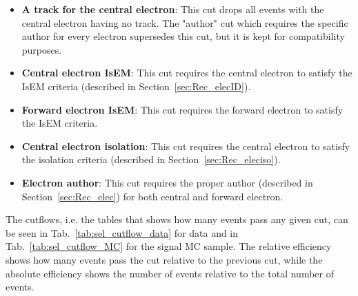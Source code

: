 \begin{itemize}
\item {\bfseries A track for the central electron}: This cut drops all events with the central electron having no track. The "author" cut which requires the specific author for every electron supersedes this cut, but it is kept for compatibility purposes.
\item {\bfseries Central electron IsEM}: This cut requires the central electron to satisfy the IsEM criteria (described in Section~\ref{sec:Rec_elecID}).
\item {\bfseries Forward electron IsEM}: This cut requires the forward electron to satisfy the IsEM criteria.
\item {\bfseries Central electron isolation}: This cut requires the central electron to satisfy the isolation criteria (described in Section~\ref{sec:Rec_eleciso}).
\item {\bfseries Electron author}: This cut requires the proper author (described in Section~\ref{sec:Rec_elec}) for both central and forward electron.
\end{itemize}

The cutflows, i.e. the tables that shows how many events pass any given cut, can be seen in Tab.~\ref{tab:sel_cutflow_data} for data and in Tab.~\ref{tab:sel_cutflow_MC} for the signal MC sample. The relative efficiency shows how many events pass the cut relative to the previous cut, while the absolute efficiency shows the number of events relative to the total number of events.

